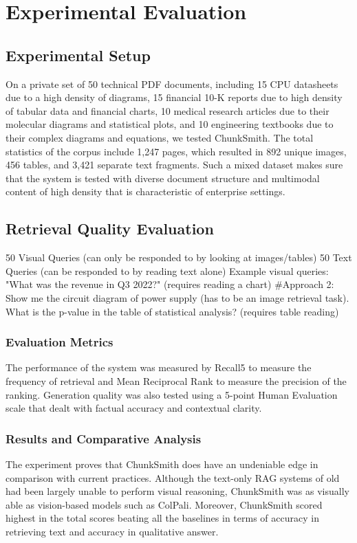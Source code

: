 \documentclass[conference]{IEEEtran}
\begin{document}
\section{Experimental Evaluation}
\subsection{Experimental Setup}
On a private set of 50 technical PDF documents, including 15 CPU datasheets due to a high density of diagrams, 15 financial 10-K reports due to high density of tabular data and financial charts, 10 medical research articles due to their molecular diagrams and statistical plots, and 10 engineering textbooks due to their complex diagrams and equations, we tested ChunkSmith. The total statistics of the corpus include 1,247 pages, which resulted in 892 unique images, 456 tables, and 3,421 separate text fragments. Such a mixed dataset makes sure that the system is tested with diverse document structure and multimodal content of high density that is characteristic of enterprise settings.

\subsection{Retrieval Quality Evaluation}
50 Visual Queries (can only be responded to by looking at images/tables) 50 Text Queries (can be responded to by reading text alone)
Example visual queries:
"What was the revenue in Q3 2022?" (requires reading a chart)
#Approach 2: Show me the circuit diagram of power supply (has to be an image retrieval task).
What is the p-value in the table of statistical analysis? (requires table reading)

\subsubsection{Evaluation Metrics}
The performance of the system was measured by Recall5 to measure the frequency of retrieval and Mean Reciprocal Rank to measure the precision of the ranking. Generation quality was also tested using a 5-point Human Evaluation scale that dealt with factual accuracy and contextual clarity.

\subsubsection{Results and Comparative Analysis}
The experiment proves that ChunkSmith does have an undeniable edge in comparison with current practices. Although the text-only RAG systems of old had been largely unable to perform visual reasoning, ChunkSmith was as visually able as vision-based models such as ColPali. Moreover, ChunkSmith scored highest in the total scores beating all the baselines in terms of accuracy in retrieving text and accuracy in qualitative answer.
\end{document}
